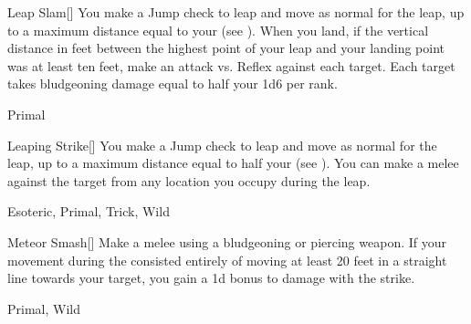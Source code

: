 \lowercase{\hypertarget{maneuver:Leap Slam}{}}\label{maneuver:Leap Slam}
\hypertarget{maneuver:Leap Slam}{}
\begin{freeability}[Rank 3]{Leap Slam}[]
You make a Jump check to leap and move as normal for the leap, up to a maximum distance equal to your  (see ).
When you land, if the vertical distance in feet between the highest point of your leap and your landing point was at least ten feet, make an attack vs. Reflex against each target.
\hit Each target takes bludgeoning damage equal to half your  \add 1d6 per rank.


 Primal
\end{freeability}
\vspace{0.25em}



\lowercase{\hypertarget{maneuver:Leaping Strike}{}}\label{maneuver:Leaping Strike}
\hypertarget{maneuver:Leaping Strike}{}
\begin{freeability}[Rank 3]{Leaping Strike}[]
You make a Jump check to leap and move as normal for the leap, up to a maximum distance equal to half your  (see ).
You can make a melee  against the target from any location you occupy during the leap.


 Esoteric, Primal, Trick, Wild
\end{freeability}
\vspace{0.25em}



\lowercase{\hypertarget{maneuver:Meteor Smash}{}}\label{maneuver:Meteor Smash}
\hypertarget{maneuver:Meteor Smash}{}
\begin{freeability}[Rank 3]{Meteor Smash}[]
Make a melee  using a bludgeoning or piercing weapon.
If your movement during the  consisted entirely of moving at least 20 feet in a straight line towards your target, you gain a \plus1d bonus to damage with the strike.


 Primal, Wild
\end{freeability}
\vspace{0.25em}



